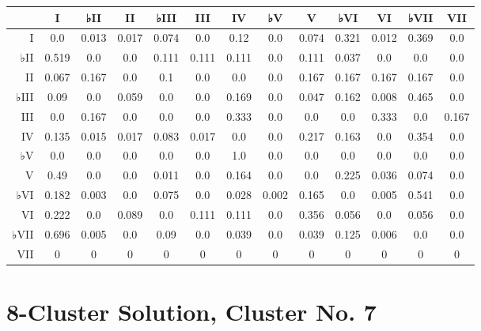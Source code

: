 \begin{table}[htbp]
\begin{minipage}{\linewidth}
\setlength{\tymax}{0.5\linewidth}
\centering
\small
\begin{tabulary}{\textwidth}{@{}RCCCCCCCCCCCC@{}} \toprule
&I&♭II&II&♭III&III&IV&♭V&V&♭VI&VI&♭VII&VII\\
\midrule
I&0.0&0.013&0.017&0.074&0.0&0.12&0.0&0.074&0.321&0.012&0.369&0.0\\
♭II&0.519&0.0&0.0&0.111&0.111&0.111&0.0&0.111&0.037&0.0&0.0&0.0\\
II&0.067&0.167&0.0&0.1&0.0&0.0&0.0&0.167&0.167&0.167&0.167&0.0\\
♭III&0.09&0.0&0.059&0.0&0.0&0.169&0.0&0.047&0.162&0.008&0.465&0.0\\
III&0.0&0.167&0.0&0.0&0.0&0.333&0.0&0.0&0.0&0.333&0.0&0.167\\
IV&0.135&0.015&0.017&0.083&0.017&0.0&0.0&0.217&0.163&0.0&0.354&0.0\\
♭V&0.0&0.0&0.0&0.0&0.0&1.0&0.0&0.0&0.0&0.0&0.0&0.0\\
V&0.49&0.0&0.0&0.011&0.0&0.164&0.0&0.0&0.225&0.036&0.074&0.0\\
♭VI&0.182&0.003&0.0&0.075&0.0&0.028&0.002&0.165&0.0&0.005&0.541&0.0\\
VI&0.222&0.0&0.089&0.0&0.111&0.111&0.0&0.356&0.056&0.0&0.056&0.0\\
♭VII&0.696&0.005&0.0&0.09&0.0&0.039&0.0&0.039&0.125&0.006&0.0&0.0\\
VII&0&0&0&0&0&0&0&0&0&0&0&0\\

\bottomrule

\end{tabulary}
\end{minipage}
\end{table}

\section{8-Cluster Solution, Cluster No. 7}
\label{8-clustersolutionclusterno.7}

